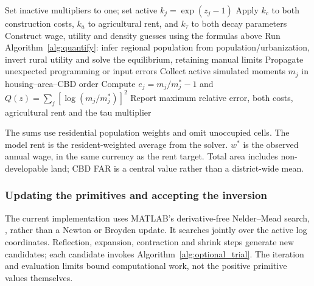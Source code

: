 \documentclass[11pt,a4paper]{article}
\newcommand{\code}[1]{\texttt{\detokenize{#1}}}
\begin{document}
\begin{algorithm2e}[H]
\caption{Evaluate optional-target errors: \texttt{CITY\_TARGET\_OBJECTIVE}}\label{alg:optional_trial}
Set inactive multipliers to one; set active $k_j=\exp(z_j-1)$\;
Apply $k_c$ to both construction costs, $k_a$ to agricultural rent, and $k_\tau$ to both decay parameters\;
Construct wage, utility and density guesses using the formulas above\;
Run Algorithm~\ref{alg:quantify}: infer regional population from population/urbanization, invert rural utility and solve the equilibrium, retaining manual limits\;
Propagate unexpected programming or input errors\;
Collect active simulated moments $m_j$ in housing--area--CBD order\;
Compute $e_j=m_j/m_j^*-1$ and $Q(z)=\sum_j[\log(m_j/m_j^*)]^2$\;
Report maximum relative error, both costs, agricultural rent and the tau multiplier\;
\end{algorithm2e}

The sums use residential population weights and omit unoccupied cells. The model rent is the resident-weighted average from the solver. $w^*$ is the observed annual wage, in the same currency as the rent target. Total area includes non-developable land; CBD FAR is a central value rather than a district-wide mean.

\clearpage
\subsubsection*{Updating the primitives and accepting the inversion}
The current implementation uses MATLAB's derivative-free Nelder--Mead search, \code{fminsearch}, rather than a Newton or Broyden update. It searches jointly over the active log coordinates. Reflection, expansion, contraction and shrink steps generate new candidates; each candidate invokes Algorithm~\ref{alg:optional_trial}. The iteration and evaluation limits bound computational work, not the positive primitive values themselves.
\end{document}
